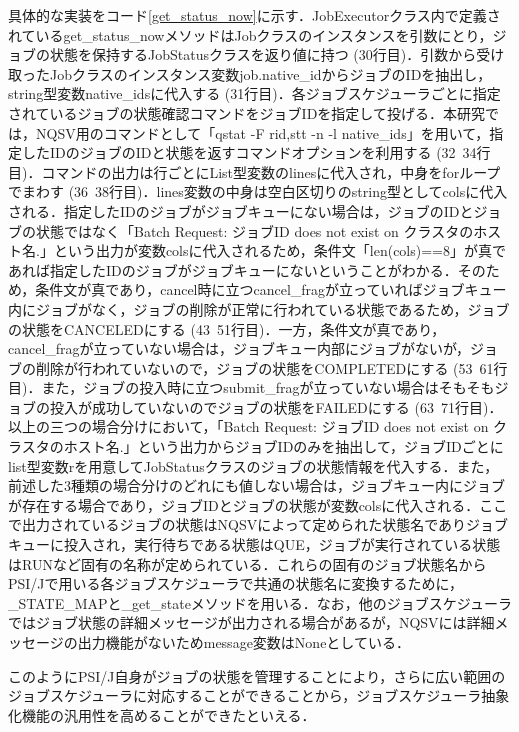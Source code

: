 具体的な実装をコード\ref{get_status_now}に示す．JobExecutorクラス内で定義されているget\_status\_nowメソッドはJobクラスのインスタンスを引数にとり，ジョブの状態を保持するJobStatusクラスを返り値に持つ (30行目)．引数から受け取ったJobクラスのインスタンス変数job.native\_idからジョブのIDを抽出し，string型変数native\_idsに代入する (31行目)．各ジョブスケジューラごとに指定されているジョブの状態確認コマンドをジョブIDを指定して投げる．本研究では，NQSV用のコマンドとして「qstat -F rid,stt -n -l native\_ids」を用いて，指定したIDのジョブのIDと状態を返すコマンドオプションを利用する (32~34行目)\cite{nqsv_reference}．コマンドの出力は行ごとにList型変数のlinesに代入され，中身をforループでまわす (36~38行目)．lines変数の中身は空白区切りのstring型としてcolsに代入される．指定したIDのジョブがジョブキューにない場合は，ジョブのIDとジョブの状態ではなく「Batch Request: ジョブID does not exist on クラスタのホスト名.」という出力が変数colsに代入されるため，条件文「len(cols)==8」が真であれば指定したIDのジョブがジョブキューにないということがわかる．そのため，条件文が真であり，cancel時に立つcancel\_fragが立っていればジョブキュー内にジョブがなく，ジョブの削除が正常に行われている状態であるため，ジョブの状態をCANCELEDにする (43~51行目)．一方，条件文が真であり，cancel\_fragが立っていない場合は，ジョブキュー内部にジョブがないが，ジョブの削除が行われていないので，ジョブの状態をCOMPLETEDにする (53~61行目)．また，ジョブの投入時に立つsubmit\_fragが立っていない場合はそもそもジョブの投入が成功していないのでジョブの状態をFAILEDにする (63~71行目)．以上の三つの場合分けにおいて，「Batch Request: ジョブID does not exist on クラスタのホスト名.」という出力からジョブIDのみを抽出して，ジョブIDごとにlist型変数rを用意してJobStatusクラスのジョブの状態情報を代入する．また，前述した3種類の場合分けのどれにも値しない場合は，ジョブキュー内にジョブが存在する場合であり，ジョブIDとジョブの状態が変数colsに代入される．ここで出力されているジョブの状態はNQSVによって定められた状態名でありジョブキューに投入され，実行待ちである状態はQUE，ジョブが実行されている状態はRUNなど固有の名称が定められている．これらの固有のジョブ状態名からPSI/Jで用いる各ジョブスケジューラで共通の状態名に変換するために，\_STATE\_MAPと\_get\_stateメソッドを用いる．なお，他のジョブスケジューラではジョブ状態の詳細メッセージが出力される場合があるが，NQSVには詳細メッセージの出力機能がないためmessage変数はNoneとしている．\par
このようにPSI/J自身がジョブの状態を管理することにより，さらに広い範囲のジョブスケジューラに対応することができることから，ジョブスケジューラ抽象化機能の汎用性を高めることができたといえる．\par

